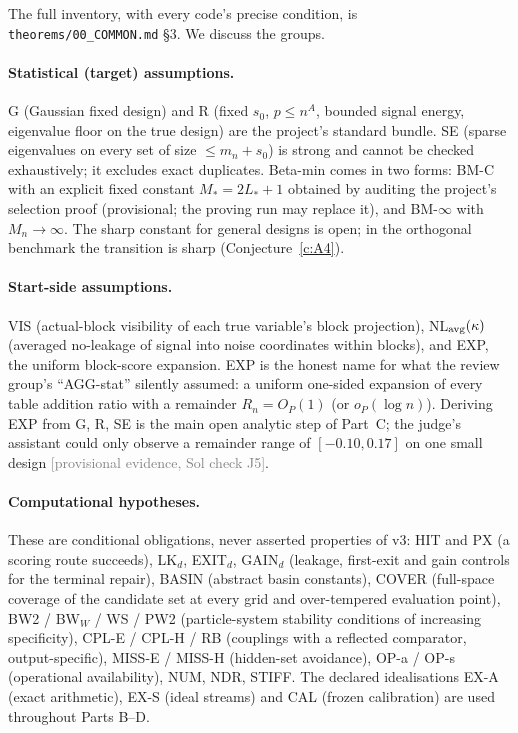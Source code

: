 \documentclass[11pt,a4paper]{article}
\theoremstyle{plain}
\theoremstyle{definition}
\theoremstyle{remark}
\newcommand{\sz}{s_0}
\newcommand{\provisional}[1]{\textcolor{gray}{[provisional evidence, Sol check #1]}}
\begin{document}
The full inventory, with every code's precise condition, is \texttt{theorems/00\_COMMON.md} \S3. We discuss the groups.

\paragraph{Statistical (target) assumptions.} G (Gaussian fixed design) and R (fixed $\sz$, $p\le n^A$, bounded signal energy, eigenvalue floor on the true design) are the project's standard bundle. SE (sparse eigenvalues on every set of size $\le m_n+\sz$) is strong and cannot be checked exhaustively; it excludes exact duplicates. Beta-min comes in two forms: BM-C with an explicit fixed constant $M_*=2L_*+1$ obtained by auditing the project's selection proof (provisional; the proving run may replace it), and BM-$\infty$ with $M_n\to\infty$. The sharp constant for general designs is open; in the orthogonal benchmark the transition is sharp (Conjecture~\ref{c:A4}).

\paragraph{Start-side assumptions.} VIS (actual-block visibility of each true variable's block projection), NL$_{\rm avg}(\kappa)$ (averaged no-leakage of signal into noise coordinates within blocks), and EXP, the uniform block-score expansion. EXP is the honest name for what the review group's ``AGG-stat'' silently assumed: a uniform one-sided expansion of every table addition ratio with a remainder $R_n=O_P(1)$ (or $o_P(\log n)$). Deriving EXP from G, R, SE is the main open analytic step of Part~C; the judge's assistant could only observe a remainder range of $[-0.10,0.17]$ on one small design \provisional{J5}.

\paragraph{Computational hypotheses.} These are conditional obligations, never asserted properties of v3: HIT and PX (a scoring route succeeds), LK$_d$, EXIT$_d$, GAIN$_d$ (leakage, first-exit and gain controls for the terminal repair), BASIN (abstract basin constants), COVER (full-space coverage of the candidate set at every grid and over-tempered evaluation point), BW2 / BW$_W$ / WS / PW2 (particle-system stability conditions of increasing specificity), CPL-E / CPL-H / RB (couplings with a reflected comparator, output-specific), MISS-E / MISS-H (hidden-set avoidance), OP-a / OP-s (operational availability), NUM, NDR, STIFF. The declared idealisations EX-A (exact arithmetic), EX-S (ideal streams) and CAL (frozen calibration) are used throughout Parts B--D.
\end{document}
